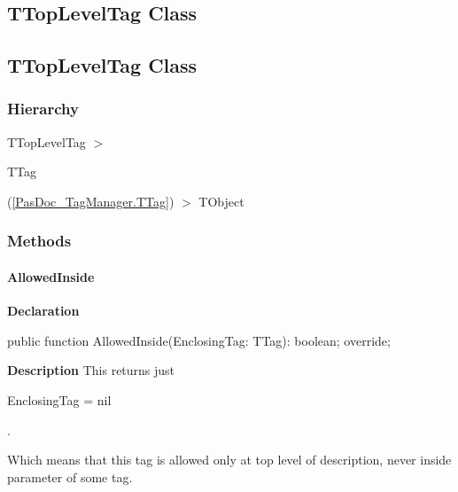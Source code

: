 \documentclass{report}
\newif\ifpdf
\begin{document}
\subsection*{\large{\textbf{TTopLevelTag Class}}\normalsize\hspace{1ex}\hrulefill}
\else
\subsection*{TTopLevelTag Class}
\fi
\label{PasDoc_TagManager.TTopLevelTag}
\subsubsection*{\large{\textbf{Hierarchy}}\normalsize\hspace{1ex}\hfill}
TTopLevelTag {$>$} \begin{ttfamily}TTag\end{ttfamily}(\ref{PasDoc_TagManager.TTag}) {$>$} 
TObject
\subsubsection*{\large{\textbf{Methods}}\normalsize\hspace{1ex}\hfill}
\paragraph*{AllowedInside}\hspace*{\fill}

\label{PasDoc_TagManager.TTopLevelTag-AllowedInside}
\begin{list}{}{
\setlength{\itemindent}{0cm}
\setlength{\listparindent}{0cm}
\setlength{\leftmargin}{\evensidemargin}
\addtolength{\leftmargin}{\tmplength}
\settowidth{\labelsep}{X}
\addtolength{\leftmargin}{\labelsep}
\setlength{\labelwidth}{\tmplength}
}
\item[\textbf{Declaration}\hfill]
\ifpdf
\begin{flushleft}
\fi
\begin{ttfamily}
public function AllowedInside(EnclosingTag: TTag): boolean; override;\end{ttfamily}

\ifpdf
\end{flushleft}
\fi

\par
\item[\textbf{Description}]
This returns just \begin{ttfamily}EnclosingTag = nil\end{ttfamily}.

Which means that this tag is allowed only at top level of description, never inside parameter of some tag.

\end{list}
\ifpdf
\end{document}
